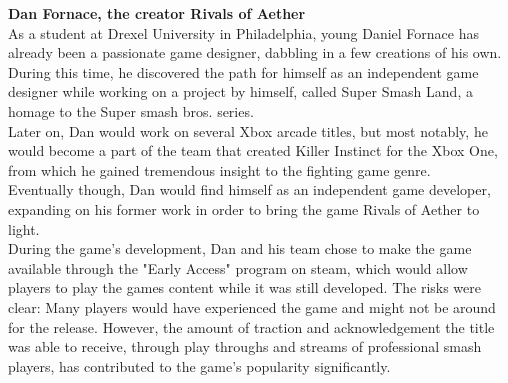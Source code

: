 \documentclass{article}
\begin{document}
\textbf{Dan Fornace, the creator Rivals of Aether}\cite{thirdkoopa2016:10}\\%
As a student at Drexel University in Philadelphia, young Daniel Fornace has already been a passionate game designer, dabbling in a few creations of his own. During this time, he discovered the path for himself as an independent game designer while working on a project by himself, called Super Smash Land, a homage to the Super smash bros. series.\\
Later on, Dan would work on several Xbox arcade titles, but most notably, he would become a part of the team that created Killer Instinct for the Xbox One, from which he gained tremendous insight to the fighting game genre.\\
Eventually though, Dan would find himself as an independent game developer, expanding on his former work in order to bring the game Rivals of Aether to light.\\

During the game's development, Dan and his team chose to make the game available through the "Early Access" program on steam, which would allow players to play the games content while it was still developed. The risks were clear: Many players would have experienced the game and might not be around for the release. However, the amount of traction and acknowledgement the title was able to receive, through play throughs and streams of professional smash players, has contributed to the game's popularity significantly.\\

\end{document}
